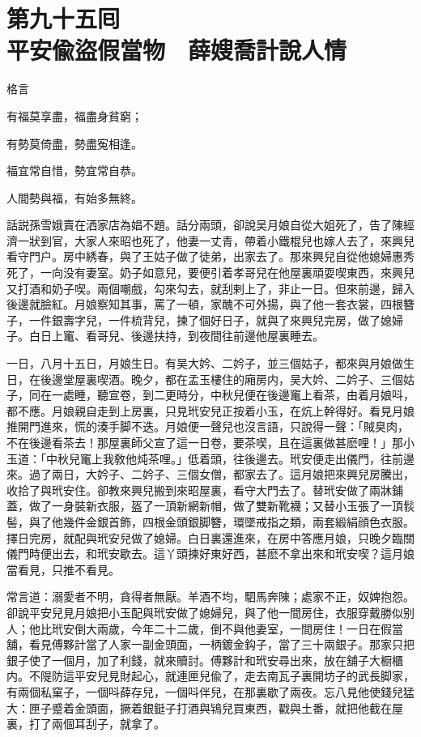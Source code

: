 
\chapter*{第九十五囘　\\平安偸盜假當物　薛嫂喬計說人情}


格言

\begin{myquote}
有福莫享盡，福盡身貧窮；

有勢莫倚盡，勢盡寃相逢。

福宜常自惜，勢宜常自恭。

人間勢與福，有始多無終。
\end{myquote}

話説孫雪娥賣在洒家店為娼不題。話分兩頭，卻說吴月娘自從大姐死了，告了陳經濟一狀到官，大家人來昭也死了，他妻一丈青，帶着小鐵棍兒也嫁人去了，來興兒看守門户。房中綉春，與了王姑子做了徒弟，出家去了。那來興兒自從他媳婦惠秀死了，一向没有妻室。奶子如意兒，要便引着孝哥兒在他屋裏頑耍喫東西，來興兒又打酒和奶子喫。兩個嘲戲，勾來勾去，就刮剌上了，非止一日。但來前邊，歸入後邊就臉紅。月娘察知其事，罵了一頓，家醜不可外揚，與了他一套衣裳，四根簪子，一件銀壽字兒，一件梳背兒，揀了個好日子，就與了來興兒完房，做了媳婦子。白日上竃、看哥兒、後邊扶持，到夜間往前邊他屋裏睡去。

一日，八月十五日，月娘生日。有吴大妗、二妗子，並三個姑子，都來與月娘做生日，在後邊堂屋裏喫酒。晚夕，都在孟玉樓住的廂房内，吴大妗、二妗子、三個姑子，同在一處睡，聽宣卷，到二更時分，中秋兒便在後邊竃上看茶，由着月娘呌，都不應。月娘親自走到上房裏，只見玳安兒正按着小玉，在炕上幹得好。看見月娘推開門進來，慌的湊手脚不迭。月娘便一聲兒也沒言語，只說得一聲：「賊臭肉，不在後邊看茶去！那屋裏師父宣了這一日卷，要茶喫，且在這裏做甚麽哩！」那小玉道：「中秋兒竃上我敎他炖茶哩。」低着頭，往後邊去。玳安便走出儀門，往前邊來。過了兩日，大妗子、二妗子、三個女僧，都家去了。這月娘把來興兒房騰出，收拾了與玳安住。卻教來興兒搬到來昭屋裏，看守大門去了。替玳安做了兩牀鋪蓋，做了一身裝新衣服，盔了一頂新網新帽，做了雙新靴襪；又替小玉張了一頂䯼髻，與了他幾件金銀首飾，四根金頭銀脚簪，環墜戒指之類，兩套緞絹顔色衣服。擇日完房，就配與玳安兒做了媳婦。白日裏還進來，在房中答應月娘，只晚夕臨關儀門時便出去，和玳安歇去。這丫頭揀好東好西，甚麽不拿出來和玳安喫？這月娘當看見，只推不看見。

常言道：溺愛者不明，貪得者無厭。羊酒不均，駟馬奔陳；處家不正，奴婢抱怨。卻說平安兒見月娘把小玉配與玳安做了媳婦兒，與了他一間房住，衣服穿戴勝似别人；他比玳安倒大兩歲，今年二十二歲，倒不與他妻室，一間房住！一日在假當舖，看見傅夥計當了人家一副金頭面，一柄鍍金鈎子，當了三十兩銀子。那家只把銀子使了一個月，加了利錢，就來贖討。傅夥計和玳安尋出來，放在舖子大橱櫃内。不隄防這平安兒見財起心，就連匣兒偸了，走去南瓦子裏開坊子的武長脚家，有兩個私窠子，一個呌薛存兒，一個呌伴兒，在那裏歇了兩夜。忘八見他使錢兒猛大：匣子蹙着金頭面，撅着銀鋌子打酒與鴇兒買東西，戳與土番，就把他截在屋裏，打了兩個耳刮子，就拿了。

